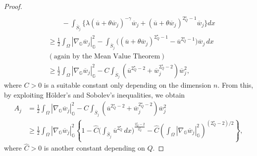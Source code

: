 \documentclass[11pt]{amsart}
\numberwithin{equation}{section} %
\theoremstyle{definition}
\begin{document}
\begin{proof}
\begin{align*}
		\\
		&\qquad -\int_{\overline{S}_j}\big\{\lambda(\overline{u}+\theta\overline{w}_j)^{-\gamma}
		\overline{w}_j+(\overline{u}+\theta\overline{w}_j)^{2^{\star}_{Q}-1}\overline{w}_j\}dx \\
		& \geq  \frac{1}{2}\int_{\Omega}|\nabla_{\mathbb{G}}\overline{w}_j|_{\mathbb{G}}^2-\int_{\overline{S}_j}
		\big((\overline{u}+\theta\overline{w}_j)^{2^{\star}_{Q}-1}-\overline{u}^{2^{\star}_{Q}-1}\big)\overline{w}_j\,dx
		\\
		& (\text{again by the Mean Value Theorem}) \\
		& \geq \frac{1}{2}\int_{\Omega}|\nabla_{\mathbb{G}}\overline{w}_j|_{\mathbb{G}}^2-C\int_{\overline{S}_j}(\overline{u}^{2^{\star}_{Q}-2}+\overline{w}_j^{2^{\star}_{Q}-2})
		\overline{w}_j^2,
	\end{align*}
	where $C > 0$ is a suitable constant only depending on the dimension $n$.
	From this, by exploiting H\"older's and Sobolev's inequalities, we obtain
	\begin{equation} \label{eq:todeduceAngeqzero}
		\begin{split}
			A_j & = \frac{1}{2}\int_{\Omega}|\nabla_{\mathbb{G}}\overline{w}_j|_{\mathbb{G}}^2 -C\int_{\overline{S}_j}(\overline{u}^{2^{\star}_{Q}-2}+\overline{w}_j^{2^{\star}_{Q}-2})
			\overline{w}_j^2 \\
			& \geq 
			\frac{1}{2}\int_{\Omega}|\nabla_{\mathbb{G}}\overline{w}_j|_{\mathbb{G}}^2 \left\{1-\hat{C}\Big(\int_{\overline{S}_j}\overline{u}^{2^{\star}_{Q}}\,dx
			\Big)^{\frac{2^{\star}_{Q}-2}{2^{\star}_{Q}}}-\hat{C}\left(\int_{\Omega}|\nabla_{\mathbb{G}}\overline{w}_j|^2_{\mathbb{G}}\right)^{(2^{\star}_{Q}-2)/2}\right\},
		\end{split}
	\end{equation}
	where $\hat{C} > 0$ is another constant depending on $Q$.
	

\end{proof}
\end{document}

